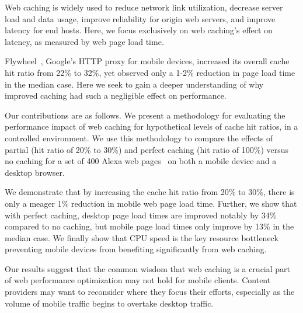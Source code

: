 \label{intro}
Web caching is widely used to reduce network link utilization, decrease server load and data usage, improve reliability for origin web servers, and improve latency for end hosts.
Here, we focus exclusively on web caching's effect on latency, as measured by web page load time.

Flywheel~\cite{flywheel}, Google's HTTP proxy for mobile devices, increased
its overall cache hit ratio from 22\% to 32\%, yet observed only a 1-2\% reduction in page load time in the median case.
Here we seek to gain a deeper understanding of why improved caching had such a negligible effect on performance.

Our contributions are as follows.
We present a methodology
for evaluating the performance impact of web caching for hypothetical levels of cache hit ratios, in a controlled environment. We use this methodology to compare the effects of partial (hit ratio of 20\% to 30\%) and
perfect caching (hit ratio of 100\%) versus no caching for a set of 400 Alexa web pages~\cite{alexa} on both a mobile device and a desktop browser.

We demonstrate that by increasing the cache hit ratio from 20\% to 30\%, there is only a meager 1\% reduction in mobile web page load time.
Further, we show that with perfect caching, desktop page load times are improved notably by 34\% compared to no caching, but mobile page load times only improve by 13\% in the median case.
We finally show that CPU speed is the key resource bottleneck preventing mobile devices from benefiting significantly from web caching.

Our results suggest that the common wisdom that web caching is a crucial part of web performance optimization may not hold for mobile clients. Content providers may want to reconsider where they focus their efforts, especially as the volume of mobile traffic begins to overtake desktop traffic.

